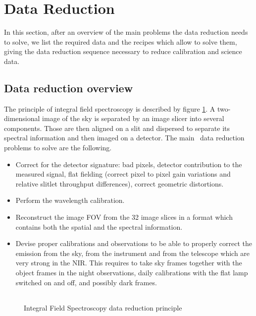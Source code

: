 \section{\label{data_reduction}Data Reduction}

In this section, after an overview of the main problems the data reduction 
needs to solve, we list the required data and the recipes which allow to 
solve them, giving the data reduction sequence necessary to reduce calibration 
and science data. 

\subsection{Data reduction overview}
The principle of integral field spectroscopy is described by 
figure \ref{ifs_principle}. A two-dimensional image of the sky is 
separated by an image slicer into several components. Those are then  
aligned on a slit and dispersed to separate its spectral information
and then imaged on a detector. 
The main \instname\, data reduction problems to solve are the following.

\begin{itemize}
\item Correct for the detector signature: bad pixels, detector contribution 
to the measured signal, flat fielding (correct pixel to pixel gain variations 
and relative slitlet throughput differences), correct geometric distortions.
\item Perform the wavelength calibration.
\item Reconstruct the image FOV from the 32 image slices in a format which 
contains both the spatial and the spectral information.
\item Devise proper calibrations and observations to be able to properly 
correct the emission from the sky, from the instrument and from the telescope 
which are very strong in the NIR.
This requires to take sky frames together with the object frames in the night 
observations, daily calibrations with the flat lamp switched on and off, and 
possibly dark frames.

\end{itemize}
\begin{figure}[ht]
\begin{center}
\begin{tabular}{c}
\end{tabular}
\end{center}
\caption{\label{ifs_principle}Integral Field Spectroscopy data reduction 
principle}
\end{figure}

